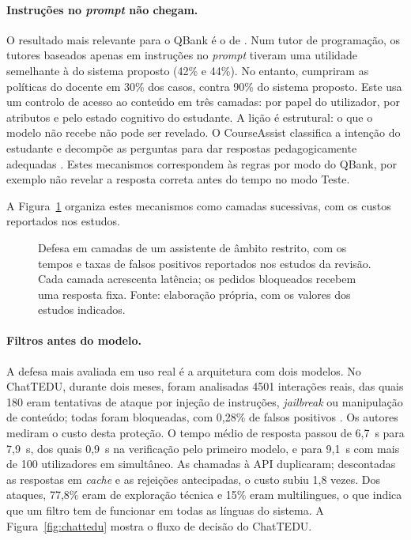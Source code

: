 \paragraph{Instruções no \emph{prompt} não chegam.} O resultado mais relevante para o QBank é o de \textcite{rayhan2026sage}. Num tutor de programação, os tutores baseados apenas em instruções no \emph{prompt} tiveram uma utilidade semelhante à do sistema proposto (42\% e 44\%). No entanto, cumpriram as políticas do docente em 30\% dos casos, contra 90\% do sistema proposto. Este usa um controlo de acesso ao conteúdo em três camadas: por papel do utilizador, por atributos e pelo estado cognitivo do estudante. A lição é estrutural: o que o modelo não recebe não pode ser revelado. O CourseAssist classifica a intenção do estudante e decompõe as perguntas para dar respostas pedagogicamente adequadas \parencite{feng2024courseassist}. Estes mecanismos correspondem às regras por modo do QBank, por exemplo não revelar a resposta correta antes do tempo no modo Teste.

A Figura~\ref{fig:security} organiza estes mecanismos como camadas sucessivas, com os custos reportados nos estudos.

\begin{figure}[htbp]
\centering

\caption[Defesa em camadas e custos reportados]{Defesa em camadas de um assistente de âmbito restrito, com os tempos e taxas de falsos positivos reportados nos estudos da revisão. Cada camada acrescenta latência; os pedidos bloqueados recebem uma resposta fixa. Fonte: elaboração própria, com os valores dos estudos indicados.}
\label{fig:security}
\end{figure}

\paragraph{Filtros antes do modelo.} A defesa mais avaliada em uso real é a arquitetura com dois modelos. No ChatTEDU, durante dois meses, foram analisadas 4501 interações reais, das quais 180 eram tentativas de ataque por injeção de instruções, \emph{jailbreak} ou manipulação de conteúdo; todas foram bloqueadas, com 0,28\% de falsos positivos \parencite{emekci2025securing}. Os autores mediram o custo desta proteção. O tempo médio de resposta passou de 6,7~s para 7,9~s, dos quais 0,9~s na verificação pelo primeiro modelo, e para 9,1~s com mais de 100 utilizadores em simultâneo. As chamadas à \gls{API} duplicaram; descontadas as respostas em \emph{cache} e as rejeições antecipadas, o custo subiu 1,8 vezes. Dos ataques, 77,8\% eram de exploração técnica e 15\% eram multilingues, o que indica que um filtro tem de funcionar em todas as línguas do sistema. A Figura~\ref{fig:chattedu} mostra o fluxo de decisão do ChatTEDU.

